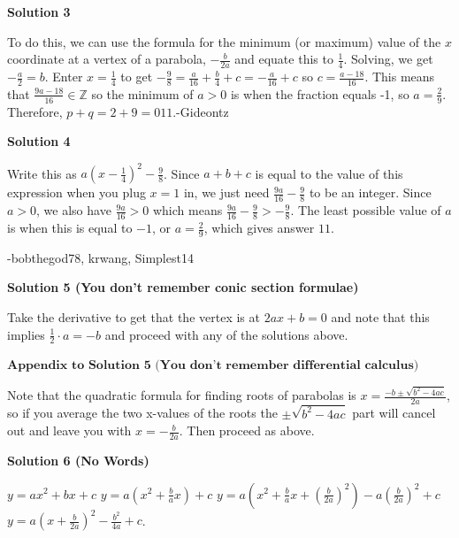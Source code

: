 \begin{enumerate}
 



\textbf{Solution 3}

To do this, we can use the formula for the minimum (or maximum) value of the $x$ coordinate at a vertex of a parabola, $-\frac{b}{2a}$ and equate this to $\frac{1}{4}$. Solving, we get $-\frac{a}{2}=b$. Enter $x=\frac{1}{4}$ to get $-\frac{9}{8}=\frac{a}{16}+\frac{b}{4}+c=-\frac{a}{16}+c$ so $c=\frac{a-18}{16}$. This means that $\frac{9a-18}{16}\in \mathbb{Z}$ so the minimum of $a>0$ is when the fraction equals -1, so $a=\frac{2}{9}$. Therefore, $p+q=2+9=\boxed{011}$.-Gideontz

 



\textbf{Solution 4}

Write this as $a\left( x- \frac 14 \right)^2 - \frac 98$. Since $a+b+c$ is equal to the value of this expression when you plug $x=1$ in, we just need $\frac{9a}{16}- \frac 98$ to be an integer. Since $a>0$, we also have $\frac{9a}{16}>0$ which means $\frac{9a}{16}- \frac 98 > -\frac{9}{8}$. The least possible value of $a$ is when this is equal to $-1$, or $a=\frac 29$, which gives answer $11$.

 -bobthegod78, krwang, Simplest14

 



\textbf{Solution 5 (You don't remember conic section formulae)}

Take the derivative to get that the vertex is at $2ax+b=0$ and note that this implies $\frac{1}{2} \cdot a = -b$ and proceed with any of the solutions above.

 
$\textbf{Appendix to Solution 5 (You don't remember differential calculus)}$

 Note that the quadratic formula for finding roots of parabolas is $x=\frac{-b\pm\sqrt{b^2-4ac}}{2a}$, so if you average the two x-values of the roots the $\pm\sqrt{b^2-4ac}$ part will cancel out and leave you with $x=-\frac{b}{2a}$. Then proceed as above.

 


 



\textbf{Solution 6 (No Words)}

$y = ax^2 + bx + c$
$y=a\left(x^2+\frac{b}{a}x\right)+c$
$y=a\left(x^2+\frac{b}{a}x+\left(\frac{b}{2a}\right)^2\right)-a\left(\frac{b}{2a}\right)^2+c$
$y=a\left(x+\frac{b}{2a}\right)^2-\frac{b^2}{4a}+c$.

 



\end{enumerate}
